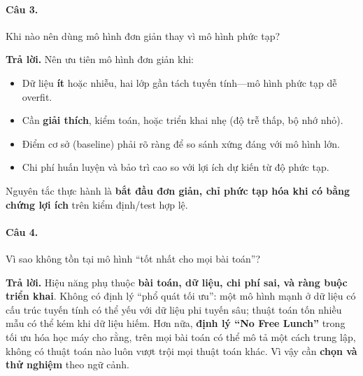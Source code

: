 \paragraph{Câu 3.} Khi nào nên dùng mô hình đơn giản thay vì mô hình phức tạp?

\medskip\noindent\textbf{Trả lời.} Nên ưu tiên mô hình đơn giản khi:
\begin{itemize}[nosep]
\item Dữ liệu \textbf{ít} hoặc nhiễu, hai lớp gần tách tuyến tính---mô hình phức tạp dễ overfit.
\item Cần \textbf{giải thích}, kiểm toán, hoặc triển khai nhẹ (độ trễ thấp, bộ nhớ nhỏ).
\item Điểm cơ sở (baseline) phải rõ ràng để so sánh xứng đáng với mô hình lớn.
\item Chi phí huấn luyện và bảo trì cao so với lợi ích dự kiến từ độ phức tạp.
\end{itemize}
Nguyên tắc thực hành là \textbf{bắt đầu đơn giản, chỉ phức tạp hóa khi có bằng chứng lợi ích} trên kiểm định/test hợp lệ.

\paragraph{Câu 4.} Vì sao không tồn tại mô hình ``tốt nhất cho mọi bài toán''?

\medskip\noindent\textbf{Trả lời.} Hiệu năng phụ thuộc \textbf{bài toán, dữ liệu, chi phí sai, và ràng buộc triển khai}. Không có định lý ``phổ quát tối ưu'': một mô hình mạnh ở dữ liệu có cấu trúc tuyến tính có thể yếu với dữ liệu phi tuyến sâu; thuật toán tốn nhiều mẫu có thể kém khi dữ liệu hiếm. Hơn nữa, \textbf{định lý ``No Free Lunch''} trong tối ưu hóa học máy cho rằng, trên mọi bài toán có thể mô tả một cách trung lập, không có thuật toán nào luôn vượt trội mọi thuật toán khác. Vì vậy cần \textbf{chọn và thử nghiệm} theo ngữ cảnh.
